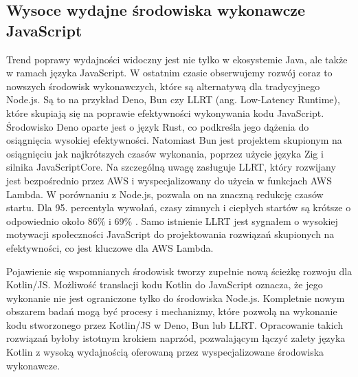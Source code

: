 \subsection*{Wysoce wydajne środowiska wykonawcze JavaScript}

Trend poprawy wydajności widoczny jest nie tylko w ekosystemie Java, ale także w ramach języka JavaScript.
W ostatnim czasie obserwujemy rozwój coraz to nowszych środowisk wykonawczych, które są alternatywą dla tradycyjnego Node.js.
Są to na przykład Deno, Bun czy LLRT (ang. Low-Latency Runtime), które skupiają się na poprawie efektywności wykonywania kodu JavaScript.
Środowisko Deno oparte jest o język Rust, co podkreśla jego dążenia do osiągnięcia wysokiej efektywności.
Natomiast Bun jest projektem skupionym na osiągnięciu jak najkrótszych czasów wykonania, poprzez użycie języka Zig i silnika JavaScriptCore.
Na szczególną uwagę zasługuje LLRT, który rozwijany jest bezpośrednio przez AWS i wyspecjalizowany do użycia w funkcjach AWS Lambda.
W porównaniu z Node.js, pozwala on na znaczną redukcję czasów startu.
Dla 95. percentyla wywołań, czasy zimnych i ciepłych startów są krótsze o odpowiednio około 86\% i 69\% \cite{llrt2025}.
Samo istnienie LLRT jest sygnałem o wysokiej motywacji społeczności JavaScript do projektowania rozwiązań skupionych na efektywności, co jest kluczowe dla AWS Lambda.

Pojawienie się wspomnianych środowisk tworzy zupełnie nową ścieżkę rozwoju dla Kotlin/JS.
Możliwość translacji kodu Kotlin do JavaScript oznacza, że jego wykonanie nie jest ograniczone tylko do środowiska Node.js.
Kompletnie nowym obszarem badań mogą być procesy i mechanizmy, które pozwolą na wykonanie kodu stworzonego przez Kotlin/JS w Deno, Bun lub LLRT.
Opracowanie takich rozwiązań byłoby istotnym krokiem naprzód, pozwalającym łączyć zalety języka Kotlin z wysoką wydajnością oferowaną przez wyspecjalizowane środowiska wykonawcze.
